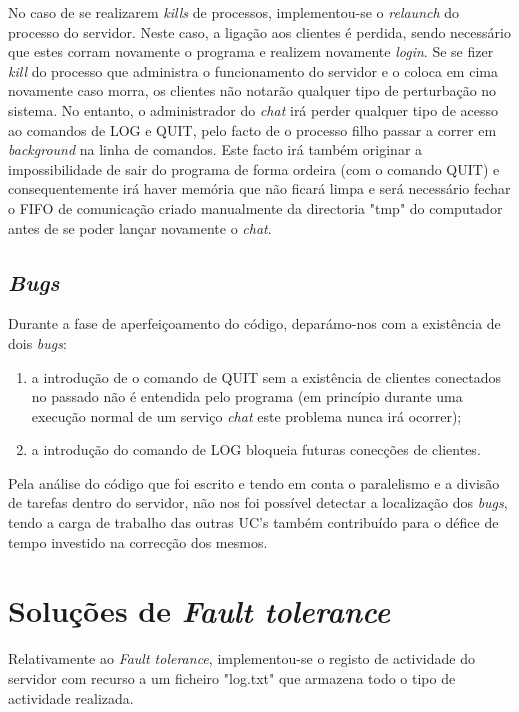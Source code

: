 \documentclass[a4paper]{article}
\begin{document}
No caso de se realizarem \textit{kills} de processos, implementou-se o \textit{relaunch} do processo do servidor. Neste caso, a ligação aos clientes é perdida, sendo necessário que estes corram novamente o programa e realizem novamente \textit{login}.
Se se fizer \textit{kill} do processo que administra o funcionamento do servidor e o coloca em cima novamente caso morra, os clientes não notarão qualquer tipo de perturbação no sistema. No entanto, o administrador do \textit{chat} irá perder qualquer tipo de acesso ao comandos de LOG e QUIT, pelo facto de o processo filho passar a correr em \textit{background} na linha de comandos. Este facto irá também originar a impossibilidade de sair do programa de forma ordeira (com o comando QUIT) e consequentemente irá haver memória que não ficará limpa e será necessário fechar o FIFO de comunicação criado manualmente da directoria "tmp" do computador antes de se poder lançar novamente o \textit{chat}.

\subsection{\textit{Bugs}}
Durante a fase de aperfeiçoamento do código, deparámo-nos com a existência de dois \textit{bugs}:

\begin{enumerate}
\item a introdução de o comando de QUIT sem a existência de clientes conectados no passado não é entendida pelo programa (em princípio durante uma execução normal de um serviço \textit{chat} este problema nunca irá ocorrer);
\item a introdução do comando de LOG bloqueia futuras conecções de clientes.
\end{enumerate}

Pela análise do código que foi escrito e tendo em conta o paralelismo e a divisão de tarefas dentro do servidor, não nos foi possível detectar a localização dos \textit{bugs}, tendo a carga de trabalho das outras UC's também contribuído para o défice de tempo investido na correcção dos mesmos.

\section{Soluções de \textit{Fault tolerance} }

Relativamente ao \textit{Fault tolerance}, implementou-se o registo de actividade do servidor com recurso a um ficheiro "log.txt" que armazena todo o tipo de actividade realizada.
\end{document}
